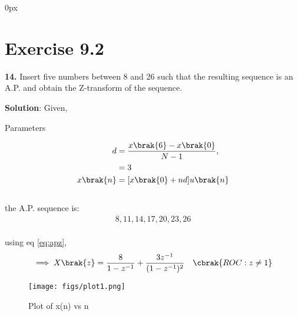 \documentclass[journal,12pt,twocolumn]{IEEEtran}
\begin{document}
\parindent 0px


\vspace{3cm}

\title{}
\author{EE23BTECH11208 - Manohar K$^{*}$
}
\maketitle
\newpage
\bigskip


\section*{Exercise 9.2}

\noindent \textbf{14.} \hspace{2pt} Insert five numbers between 8 and 26 such that the resulting sequence is an A.P. and obtain the Z-transform of the sequence.

\noindent \textbf{Solution}:
\fi
\noindent
Given,
\begin{table}[h]
    \centering
    
    \caption{Parameters}
    \label{tab: 11.9.2.14.1}
\end{table}
\begin{align}
	d&=\frac{x\brak{6} - x\brak{0}}{N-1},\\
    &=3\\
	x\brak{n}&=[x\brak{0}+nd] u\brak{n}
\end{align}\\	
the A.P. sequence is:\\
\begin{align}
8,11,14,17,20,23,26
\end{align}\\
using eq \eqref{eq:apz},
\begin{align}
    \implies X\brak{z}&=\frac{8}{1-z^{-1}} + \frac{3 z^{-1}}{(1-z^{-1})^2} &\cbrak{ROC : z \neq 1}
\end{align}
\begin{figure}[ht]
\centering
   \texttt{[image: figs/plot1.png]}
   \caption{Plot of x(n) vs n}
   \hfill\label{fig: 11.9.2.14}
\end{figure}
\end{document}
